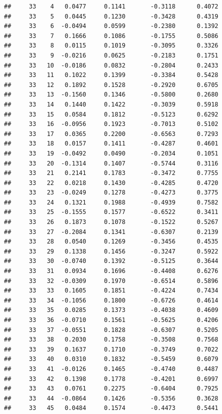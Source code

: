 \documentclass[
]{article}
\begin{document}
\begin{verbatim}
##     33    4   0.0477     0.1141       -0.3118      0.4072  
##     33    5   0.0445     0.1230       -0.3428      0.4319  
##     33    6  -0.0494     0.0599       -0.2380      0.1392  
##     33    7   0.1666     0.1086       -0.1755      0.5086  
##     33    8   0.0115     0.1019       -0.3095      0.3326  
##     33    9  -0.0216     0.0625       -0.2183      0.1751  
##     33   10  -0.0186     0.0832       -0.2804      0.2433  
##     33   11   0.1022     0.1399       -0.3384      0.5428  
##     33   12   0.1892     0.1528       -0.2920      0.6705  
##     33   13  -0.1560     0.1346       -0.5800      0.2680  
##     33   14   0.1440     0.1422       -0.3039      0.5918  
##     33   15   0.0584     0.1812       -0.5123      0.6292  
##     33   16  -0.0956     0.1923       -0.7013      0.5102  
##     33   17   0.0365     0.2200       -0.6563      0.7293  
##     33   18   0.0157     0.1411       -0.4287      0.4601  
##     33   19  -0.0492     0.0490       -0.2034      0.1051  
##     33   20  -0.1314     0.1407       -0.5744      0.3116  
##     33   21   0.2141     0.1783       -0.3472      0.7755  
##     33   22   0.0218     0.1430       -0.4285      0.4720  
##     33   23  -0.0249     0.1278       -0.4273      0.3775  
##     33   24   0.1321     0.1988       -0.4939      0.7582  
##     33   25  -0.1555     0.1577       -0.6522      0.3411  
##     33   26   0.1873     0.1078       -0.1522      0.5267  
##     33   27  -0.2084     0.1341       -0.6307      0.2139  
##     33   28   0.0540     0.1269       -0.3456      0.4535  
##     33   29   0.1338     0.1456       -0.3247      0.5922  
##     33   30  -0.0740     0.1392       -0.5125      0.3644  
##     33   31   0.0934     0.1696       -0.4408      0.6276  
##     33   32  -0.0309     0.1970       -0.6514      0.5896  
##     33   33   0.1605     0.1851       -0.4224      0.7434  
##     33   34  -0.1056     0.1800       -0.6726      0.4614  
##     33   35   0.0285     0.1373       -0.4038      0.4609  
##     33   36  -0.0710     0.1561       -0.5625      0.4206  
##     33   37  -0.0551     0.1828       -0.6307      0.5205  
##     33   38   0.2030     0.1758       -0.3508      0.7568  
##     33   39   0.1637     0.1710       -0.3749      0.7022  
##     33   40   0.0310     0.1832       -0.5459      0.6079  
##     33   41  -0.0126     0.1465       -0.4740      0.4487  
##     33   42   0.1398     0.1778       -0.4201      0.6997  
##     33   43   0.0761     0.2275       -0.6404      0.7925  
##     33   44  -0.0864     0.1426       -0.5356      0.3628  
##     33   45   0.0484     0.1574       -0.4473      0.5441  

\end{verbatim}
\end{document}
